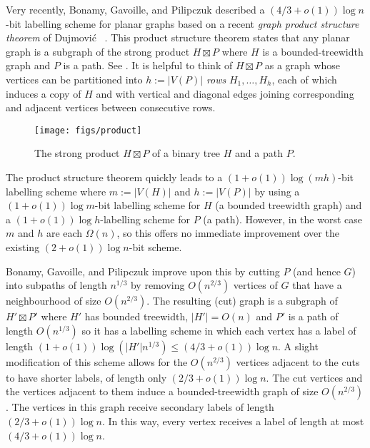 \documentclass[kpfonts]{patmorin}
\begin{document}
Very recently, Bonamy, Gavoille, and Pilipczuk \cite{bonamy.gavoille.ea:shorter} described a $(4/3+o(1))\log n$-bit labelling scheme for planar graphs based on a recent \emph{graph product structure theorem} of Dujmović \etal\ \cite{dujmovic.joret.ea:planar}.  This product structure theorem states that any planar graph is a subgraph of the strong product $H\boxtimes P$ where $H$ is a bounded-treewidth graph and $P$ is a path. See . It is helpful to think of $H\boxtimes P$ as a graph whose vertices can be partitioned into $h:=|V(P)|$ \emph{rows} $H_1,\ldots,H_{h}$, each of which induces a copy of $H$ and with vertical and diagonal edges joining corresponding and adjacent vertices between consecutive rows.  

\begin{figure}[htbp]
  \begin{center}
    \texttt{[image: figs/product]}
  \end{center}
  \caption{The strong product $H\boxtimes P$ of a binary tree $H$ and a path $P$.}
\end{figure}  

The product structure theorem quickly leads to a $(1+o(1))\log(mh)$-bit labelling scheme where $m:=|V(H)|$ and $h:=|V(P)|$ by using a $(1+o(1))\log m$-bit labelling scheme for $H$ (a bounded treewidth graph) and a $(1+o(1))\log h$-labelling scheme for $P$ (a path).  However, in the worst case $m$ and $h$ are each $\Omega(n)$, so this offers no immediate improvement over the existing $(2+o(1))\log n$-bit scheme.

Bonamy, Gavoille, and Pilipczuk improve upon this by cutting $P$ (and hence $G$) into subpaths of length $n^{1/3}$ by removing $O(n^{2/3})$ vertices of $G$ that have a neighbourhood of size $O(n^{2/3})$. The resulting (cut) graph is a subgraph of $H'\boxtimes P'$ where $H'$ has bounded treewidth, $|H'|=O(n)$ and $P'$ is a path of length $O(n^{1/3})$ so it has a labelling scheme in which each vertex has a label of length $(1+o(1))\log (|H'|n^{1/3})\le (4/3+o(1))\log n$.  A slight modification of this scheme allows for the $O(n^{2/3})$ vertices adjacent to the cuts to have shorter labels, of length only $(2/3+o(1))\log n$.  The cut vertices and the vertices adjacent to them induce a bounded-treewidth graph of size $O(n^{2/3})$.  The vertices in this graph receive secondary labels of length $(2/3+o(1))\log n$.  In this way, every vertex receives a label of length at most $(4/3 + o(1))\log n$.
\end{document}
